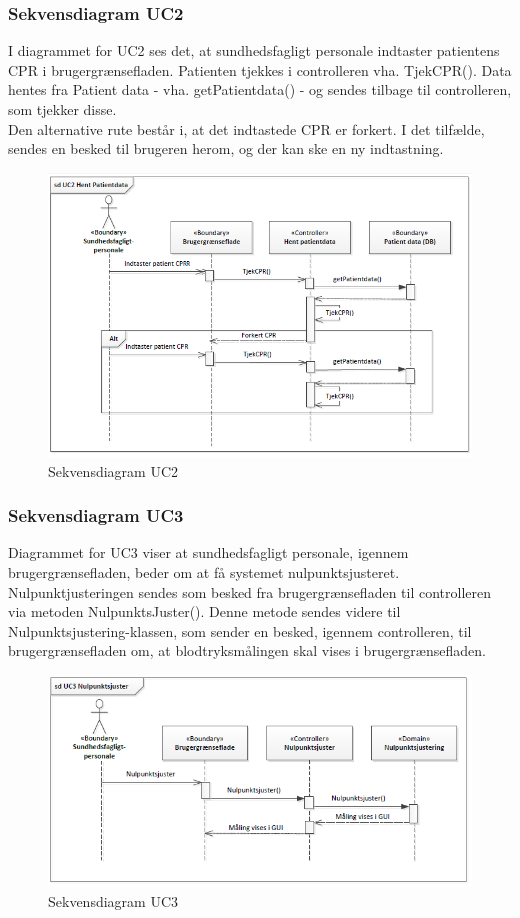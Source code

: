 \subsubsection{Sekvensdiagram UC2}
I diagrammet for UC2 ses det, at sundhedsfagligt personale indtaster patientens CPR i brugergrænsefladen. Patienten tjekkes i controlleren vha. TjekCPR(). Data hentes fra Patient data - vha. getPatientdata() - og sendes tilbage til controlleren, som tjekker disse. \\
Den alternative rute består i, at det indtastede CPR er forkert. I det tilfælde, sendes en besked til brugeren herom, og der kan ske en ny indtastning.
\begin{figure}[H]
\centering
\includegraphics[scale=0.70]{sd2.0.PNG}
\caption{Sekvensdiagram UC2}
\end{figure}

\subsubsection{Sekvensdiagram UC3}
Diagrammet for UC3 viser at sundhedsfagligt personale, igennem brugergrænsefladen, beder om at få systemet nulpunktsjusteret. Nulpunktjusteringen sendes som besked fra brugergrænsefladen til controlleren via metoden NulpunktsJuster(). Denne metode sendes videre til Nulpunktsjustering-klassen, som sender en besked, igennem controlleren, til brugergrænsefladen om, at blodtryksmålingen skal vises i brugergrænsefladen.
\begin{figure}[H]
\centering
\includegraphics[scale=0.70]{sd3.PNG}
\caption{Sekvensdiagram UC3}
\end{figure}

